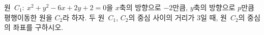 원~$C_1:\ x^2+y^2-6x+2y+2=0$을 $x$축의 방향으로 \mbox{$-2$만큼,} $y$축의 방향으로 $p$만큼 평행이동한 원을 $C_2$라 하자. 두 원~$C_1$, $C_2$의 중심 사이의 거리가 $3$일 때, 원~$C_2$의 중심의 좌표를 구하시오. 
